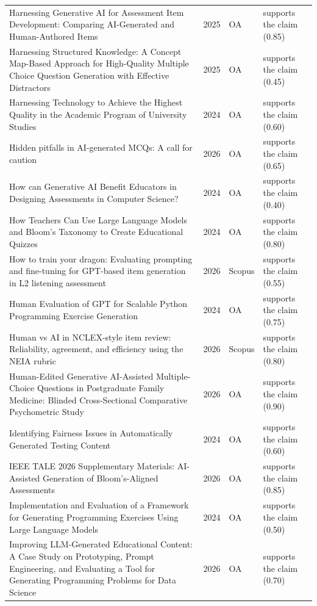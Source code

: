 \begin{longtable}{@{}%
  >{\raggedright\arraybackslash}p{}c%
  >{\raggedright\arraybackslash}p{}%
  >{\raggedright\arraybackslash}p{}@{}}
Harnessing Generative AI for Assessment Item Development: Comparing AI-Generated and Human-Authored Items & 2025 & OA & supports the claim (0.85) \\
Harnessing Structured Knowledge: A Concept Map-Based Approach for High-Quality Multiple Choice Question Generation with Effective Distractors & 2025 & OA & supports the claim (0.45) \\
Harnessing Technology to Achieve the Highest Quality in the Academic Program of University Studies & 2024 & OA & supports the claim (0.60) \\
Hidden pitfalls in AI-generated MCQs: A call for caution & 2026 & OA & supports the claim (0.65) \\
How can Generative AI Benefit Educators in Designing Assessments in Computer Science? & 2024 & OA & supports the claim (0.40) \\
How Teachers Can Use Large Language Models and Bloom's Taxonomy to Create Educational Quizzes & 2024 & OA & supports the claim (0.80) \\
How to train your dragon: Evaluating prompting and fine-tuning for GPT-based item generation in L2 listening assessment & 2026 & Scopus & supports the claim (0.55) \\
Human Evaluation of GPT for Scalable Python Programming Exercise Generation & 2024 & OA & supports the claim (0.75) \\
Human vs AI in NCLEX-style item review: Reliability, agreement, and efficiency using the NEIA rubric & 2026 & Scopus & supports the claim (0.80) \\
Human-Edited Generative AI-Assisted Multiple-Choice Questions in Postgraduate Family Medicine: Blinded Cross-Sectional Comparative Psychometric Study & 2026 & OA & supports the claim (0.90) \\
Identifying Fairness Issues in Automatically Generated Testing Content & 2024 & OA & supports the claim (0.60) \\
IEEE TALE 2026 Supplementary Materials: AI-Assisted Generation of Bloom's-Aligned Assessments & 2026 & OA & supports the claim (0.85) \\
Implementation and Evaluation of a Framework for Generating Programming Exercises Using Large Language Models & 2024 & OA & supports the claim (0.50) \\
Improving LLM-Generated Educational Content: A Case Study on Prototyping, Prompt Engineering, and Evaluating a Tool for Generating Programming Problems for Data Science & 2026 & OA & supports the claim (0.70) \\

\end{longtable}
